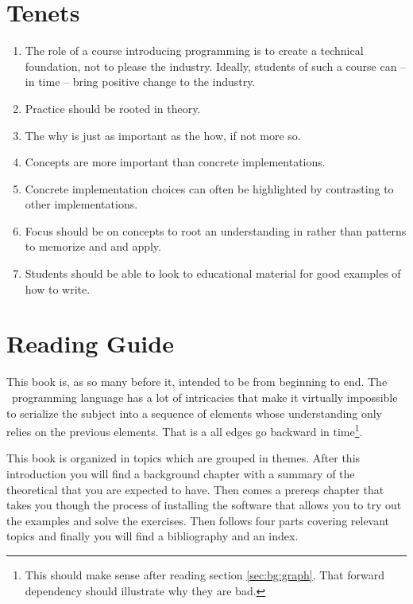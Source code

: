 \section{Tenets}

\begin{enumerate}
  \item The role of a course introducing programming is to create a technical foundation, not to please the industry. Ideally, students of such a course can -- in time -- bring positive change to the industry.
  \item Practice should be rooted in theory.
  \item The why is just as important as the how, if not more so.
  \item Concepts are more important than concrete implementations.
  \item Concrete implementation choices can often be highlighted by contrasting to other implementations.
  \item Focus should be on concepts to root an understanding in rather than patterns to memorize and and apply.
  \item Students should be able to look to educational material for good examples of how to write.
\end{enumerate}

\section{Reading Guide}

This book is, as so many before it, intended to be  from beginning to end. The \csharp\ programming language has a lot of intricacies that make it virtually impossible to serialize the subject into a sequence of elements whose understanding only relies on the previous elements. That is a  all edges go backward in time\footnote{This should make sense after reading section \ref{sec:bg:graph}. That forward dependency should illustrate why they are bad.}.

This book is organized in topics which are grouped in themes. After this introduction you will find a background chapter with a summary of the theoretical that you are expected to have. Then comes a prereqs chapter that takes you though the process of installing the software that allows you to try out the examples and solve the exercises. Then follows four parts covering relevant topics and finally you will find a bibliography and an index.

